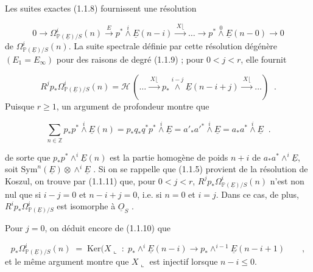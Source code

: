 Les suites exactes (1.1.8) fournissent une résolution

\begin{equation}\tag{1.1.10}
0 \longrightarrow \Omega^i_{\mathbb{P}(\underline{E})/S}(n) \xrightarrow{\;E\;} p^* \overset{i}{\wedge} \underline{E}(n-i) \xrightarrow{\;X\lfloor\;} \ldots \longrightarrow p^* \overset{0}{\wedge} \underline{E}(n-0) \longrightarrow 0
\end{equation}
de $\Omega^i_{\mathbb{P}(\underline{E})/S}(n)$. La suite spectrale définie par cette résolution dégénère $(E_1 = E_\infty)$ pour des raisons de degré (1.1.9) ; pour $0 < j < r$, elle fournit

\begin{equation}\tag{1.1.11}
R^j p_* \Omega^i_{\mathbb{P}(\underline{E})/S}(n) = \mathcal{H} \, ( \ldots \xrightarrow{\;X\lfloor\;} p_* \overset{i-j}{\wedge} \underline{E}(n-i+j) \xrightarrow{\;X\lfloor\;} \ldots ) \;\; .
\end{equation}
Puisque $r \geq 1$, un argument de profondeur montre que

\begin{equation}\tag{1.1.12}
\sum_{n \in \mathbb{Z}} p_*p^* \overset{i}{\wedge} \underline{E}(n) = p_*q_*q^*p^* \overset{i}{\wedge} \underline{E} = {a'}_{*}{a'}^{*} \overset{i}{\wedge} \underline{E} = a_*a^* \overset{i}{\wedge} \underline{E} \;\; .
\end{equation}


 de sorte que $p_*p^* \wedge^i \underline{E}(n)$ est la partie homogène de poids $n + i$ de $a_*a^* \wedge^i \underline{E}$, soit $\mathrm{Sym}^n(\underline{E}) \otimes \wedge^i \underline{E}$ . Si on se rappelle que (1.1.5) provient de la résolution de Koszul, on trouve par (1.1.11) que, pour $0 < j < r$, $R^j p_* \Omega^i_{\mathbb{P}(\underline{E})/S}(n)$ n'est non nul que si $i-j = 0$ et $n-i+j = 0$, i.e. si $n = 0$ et $i = j$. Dans ce cas, de plus, $R^i p_* \Omega^i_{\mathbb{P}(\underline{E})/S}$ est isomorphe à $\underline{O}_S$ .

Pour $j = 0$, on déduit encore de (1.1.10) que

\begin{equation}\tag{1.1.13}
p_*\Omega^i_{\mathbb{P}(\underline{E})/S}(n) \;=\; \mathrm{Ker}(X \llcorner \;:\; p_* \wedge^i \underline{E}(n-i) \longrightarrow p_* \wedge^{i-1} \underline{E}(n-i+1) \qquad ,
\end{equation}
et le même argument montre que $X \llcorner$ est injectif lorsque $n-i \leq 0$.

